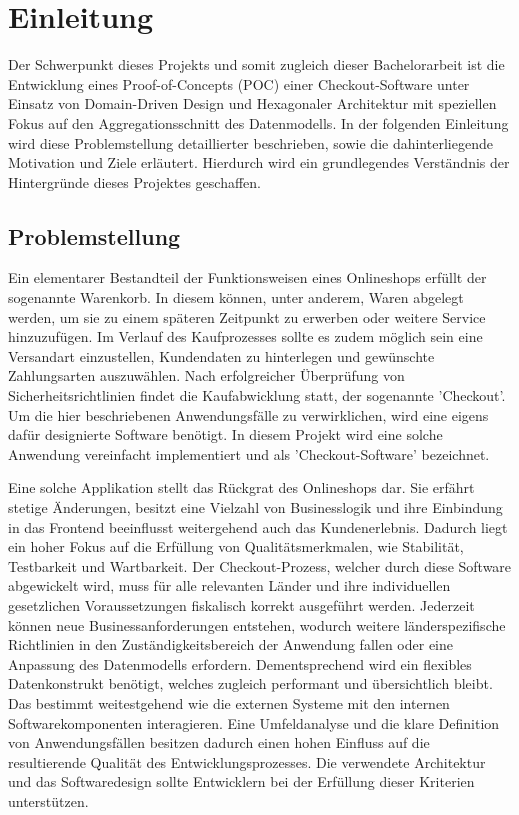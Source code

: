 

\chapter{Einleitung}

Der Schwerpunkt dieses Projekts und somit zugleich dieser Bachelorarbeit ist die Entwicklung eines Proof-of-Concepts (\acrshort{POC}) einer Checkout-Software unter Einsatz von Domain-Driven Design und Hexagonaler Architektur mit speziellen Fokus auf den Aggregationsschnitt des Datenmodells. In der folgenden Einleitung wird diese Problemstellung detaillierter beschrieben, sowie die dahinterliegende Motivation und Ziele erläutert. Hierdurch wird ein grundlegendes Verständnis der Hintergründe dieses Projektes geschaffen.

\section{Problemstellung}

Ein elementarer Bestandteil der Funktionsweisen eines Onlineshops erfüllt der sogenannte Warenkorb. In diesem können, unter anderem, Waren abgelegt werden, um sie zu einem späteren Zeitpunkt zu erwerben oder weitere Service hinzuzufügen. Im Verlauf des Kaufprozesses sollte es zudem möglich sein eine Versandart einzustellen, Kundendaten zu hinterlegen und gewünschte Zahlungsarten auszuwählen. Nach erfolgreicher Überprüfung von Sicherheitsrichtlinien findet die Kaufabwicklung statt, der sogenannte 'Checkout'. Um die hier beschriebenen Anwendungsfälle zu verwirklichen, wird eine eigens dafür designierte Software benötigt. In diesem Projekt wird eine solche Anwendung vereinfacht implementiert und als 'Checkout-Software' bezeichnet.

Eine solche Applikation stellt das Rückgrat des Onlineshops dar. Sie erfährt stetige Änderungen, besitzt eine Vielzahl von Businesslogik und ihre Einbindung in das Frontend beeinflusst weitergehend auch das Kundenerlebnis. Dadurch liegt ein hoher Fokus auf die Erfüllung von Qualitätsmerkmalen, wie Stabilität, Testbarkeit und Wartbarkeit. Der Checkout-Prozess, welcher durch diese Software abgewickelt wird, muss für alle relevanten Länder und ihre individuellen gesetzlichen Voraussetzungen fiskalisch korrekt ausgeführt werden. Jederzeit können neue Businessanforderungen entstehen, wodurch weitere länderspezifische Richtlinien in den Zuständigkeitsbereich der Anwendung fallen oder eine Anpassung des Datenmodells erfordern. Dementsprechend wird ein flexibles Datenkonstrukt benötigt, welches zugleich performant und übersichtlich bleibt. Das  bestimmt weitestgehend wie die externen Systeme mit den internen Softwarekomponenten interagieren. Eine Umfeldanalyse und die klare Definition von Anwendungsfällen besitzen dadurch einen hohen Einfluss auf die resultierende Qualität des Entwicklungsprozesses. Die verwendete Architektur und das Softwaredesign sollte Entwicklern bei der Erfüllung dieser Kriterien unterstützen. 

